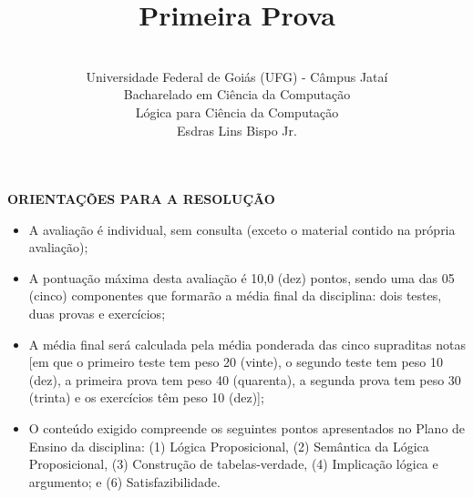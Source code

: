 \documentclass[11pt,a4paper,oneside]{article}
\author{\\Universidade Federal de Goiás (UFG) - Câmpus Jataí\\Bacharelado em Ciência da Computação \\Lógica para Ciência da Computação \\Esdras Lins Bispo Jr.}
\title{\sc \huge Primeira Prova}
\begin{document}
\maketitle

{\bf ORIENTAÇÕES PARA A RESOLUÇÃO}

\begin{itemize}
	\item A avaliação é individual, sem consulta (exceto o material contido na própria avaliação);
	\item A pontuação máxima desta avaliação é 10,0 (dez) pontos, sendo uma das 05 (cinco) componentes que formarão a média final da disciplina: dois testes, duas provas e exercícios;
	\item A média final será calculada pela média ponderada das cinco supraditas notas [em que o primeiro teste tem peso 20 (vinte), o segundo teste tem peso 10 (dez), a primeira prova tem peso 40 (quarenta), a segunda prova tem peso 30 (trinta) e os exercícios têm peso 10 (dez)];
	\item O conteúdo exigido compreende os seguintes pontos apresentados no Plano de Ensino da disciplina: (1) Lógica Proposicional, (2) Semântica da Lógica Proposicional, (3) Construção de tabelas-verdade, (4) Implicação lógica e argumento; e (6) Satisfazibilidade.
\end{itemize}

\begin{center}
\end{center}

\newpage
\end{document}
